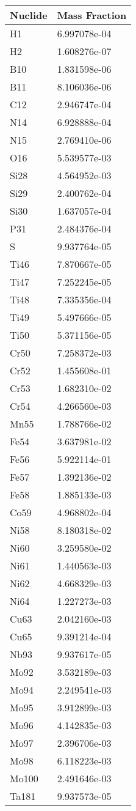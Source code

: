 \begin{centering}
\begin{longtable}[ht!]
\caption{Table showing the isotopic description of material M105}
\label{table:material_M105}
\end{longtable}\clearpage

\begin{longtable}[ht!]
{ p{} | p{} }
\hline
Nuclide & Mass Fraction\\
\hline
H1 & 6.997078e-04\\
H2 & 1.608276e-07\\
B10 & 1.831598e-06\\
B11 & 8.106036e-06\\
C12 & 2.946747e-04\\
N14 & 6.928888e-04\\
N15 & 2.769410e-06\\
O16 & 5.539577e-03\\
Si28 & 4.564952e-03\\
Si29 & 2.400762e-04\\
Si30 & 1.637057e-04\\
P31 & 2.484376e-04\\
S & 9.937764e-05\\
Ti46 & 7.870667e-05\\
Ti47 & 7.252245e-05\\
Ti48 & 7.335356e-04\\
Ti49 & 5.497666e-05\\
Ti50 & 5.371156e-05\\
Cr50 & 7.258372e-03\\
Cr52 & 1.455608e-01\\
Cr53 & 1.682310e-02\\
Cr54 & 4.266560e-03\\
Mn55 & 1.788766e-02\\
Fe54 & 3.637981e-02\\
Fe56 & 5.922114e-01\\
Fe57 & 1.392136e-02\\
Fe58 & 1.885133e-03\\
Co59 & 4.968802e-04\\
Ni58 & 8.180318e-02\\
Ni60 & 3.259580e-02\\
Ni61 & 1.440563e-03\\
Ni62 & 4.668329e-03\\
Ni64 & 1.227273e-03\\
Cu63 & 2.042160e-03\\
Cu65 & 9.391214e-04\\
Nb93 & 9.937617e-05\\
Mo92 & 3.532189e-03\\
Mo94 & 2.249541e-03\\
Mo95 & 3.912899e-03\\
Mo96 & 4.142835e-03\\
Mo97 & 2.396706e-03\\
Mo98 & 6.118223e-03\\
Mo100 & 2.491646e-03\\
Ta181 & 9.937573e-05\\


\end{longtable}
\end{centering}

